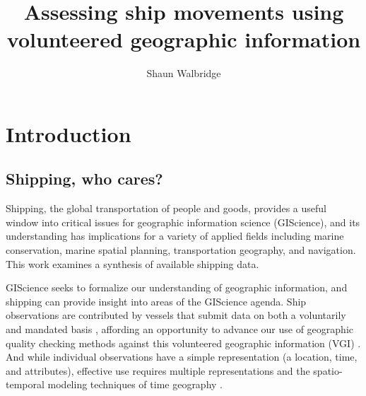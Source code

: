 \documentclass[12pt,letterpaper]{article}
\begin{document}
\title{\Huge{Assessing ship movements using volunteered geographic information}}
\author{Shaun Walbridge}
\maketitle{}

\section{Introduction}

\subsection{Shipping, who cares?}

Shipping, the global transportation of people and goods, provides a useful window into critical issues for geographic information science (GIScience), and its understanding has implications for a variety of applied fields including marine conservation, marine spatial planning, transportation geography, and navigation.  This work examines a synthesis of available shipping data.

GIScience seeks to formalize our understanding of geographic information, and shipping can provide insight into areas of the GIScience agenda. Ship observations are contributed by vessels that submit data on both a voluntarily and mandated basis \citep{VOSClim,Tetreault2002}, affording an opportunity to advance our use of geographic quality checking methods \citep{goodchildli2012} against this volunteered geographic information (VGI) \citep{goodchild2007citizens}. And while individual observations have a simple representation (a location, time, and attributes), effective use requires multiple representations \citep{Goodchild1992} and the spatio-temporal modeling techniques of time geography \citep{miller2008field}.
\end{document}

